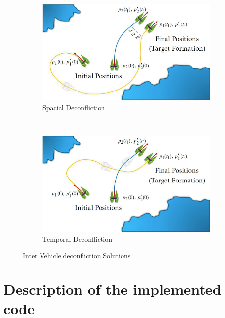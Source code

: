 \begin{figure}
    \centering
    \begin{subfigure}[b]{0.45\textwidth}
        \includegraphics[width=\textwidth]{Images/spacial_deconf.jpg}
        \caption{Spacial Deconfliction}
    \end{subfigure}
    ~
    \begin{subfigure}[b]{0.45\textwidth}
        \includegraphics[width=\textwidth]{Images/temporal_deconf.jpg}
        \caption{Temporal Deconfliction}
    \end{subfigure}
    \caption{Inter Vehicle deconfliction Solutions}
    \label{fig:deconfliction}
\end{figure}

\section{Description of the implemented code}

